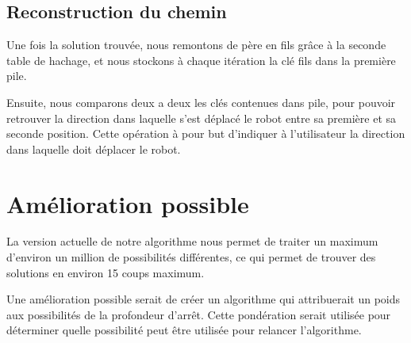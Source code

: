 \subsection{Reconstruction du chemin}
Une fois la solution trouvée, nous remontons de père en fils grâce à la seconde table de hachage, et nous stockons à chaque itération la clé fils dans la première pile. 

Ensuite, nous comparons deux a deux les clés contenues dans pile, pour pouvoir retrouver la direction dans laquelle s'est déplacé le robot entre sa première et sa seconde position. Cette opération à pour but d'indiquer à l'utilisateur la direction dans laquelle doit déplacer le robot.

\section{Amélioration possible}
La version actuelle de notre algorithme nous permet de traiter un maximum d'environ un million de possibilités différentes, ce qui permet de trouver des solutions en environ 15 coups maximum.

Une amélioration possible serait de créer un algorithme qui attribuerait un poids aux possibilités de la profondeur d'arrêt. Cette pondération serait utilisée pour déterminer quelle possibilité peut être utilisée pour relancer l'algorithme.
